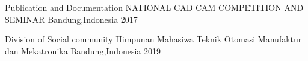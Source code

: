 

\begin{cvhonors}

  \cvhonor
    {Publication and Documentation} %
    {NATIONAL CAD CAM COMPETITION AND SEMINAR} %
    {Bandung,Indonesia} %
    {2017} %

  \cvhonor
    {Division of Social community} %
    {Himpunan Mahasiwa Teknik Otomasi Manufaktur dan Mekatronika} %
    {Bandung,Indonesia} %
    {2019} %

\end{cvhonors}
